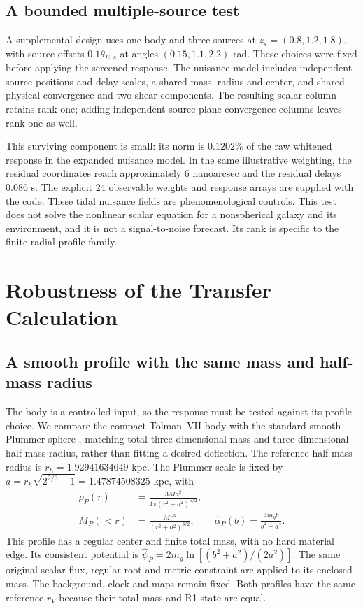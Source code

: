 \subsection{A bounded multiple-source test}
A supplemental design uses one body and three sources at
$z_s=(0.8,1.2,1.8)$, with source offsets $0.1\theta_{E,s}$ at angles
$(0.15,1.1,2.2)$ rad. These choices were fixed before applying the
screened response. The nuisance model includes independent source
positions and delay scales, a shared mass, radius and center, and
shared physical convergence and two shear components.
The resulting scalar column retains rank one; adding independent
source-plane convergence columns leaves rank one as well.

This surviving component is small: its norm is $0.1202\%$ of the raw
whitened response in the expanded nuisance model. In the same illustrative
weighting, the residual coordinates reach approximately $6$ nanoarcsec
and the residual delays $0.086$ s. The explicit 24 observable weights and
response arrays are supplied with the code.
These tidal nuisance fields are phenomenological controls. This test
does not solve the nonlinear scalar equation for a nonspherical galaxy
and its environment, and it is not a signal-to-noise forecast. Its rank
is specific to the finite radial profile family.

\section{Robustness of the Transfer Calculation}
\label{sec:robustness}
\subsection{A smooth profile with the same mass and half-mass radius}
The body is a controlled input, so the response must be tested against
its profile choice. We compare the compact Tolman--VII body with the
standard smooth Plummer sphere \citep{Plummer1911}, matching total
three-dimensional mass and three-dimensional half-mass radius, rather
than fitting a desired deflection. The reference half-mass radius is
$r_h=1.92941634649$ kpc. The Plummer scale is fixed by
$a=r_h\sqrt{2^{2/3}-1}=1.47874508325$ kpc, with
\begin{align}
 \rho_P(r)&=\frac{3Ma^2}{4\pi(r^2+a^2)^{5/2}},\nonumber\\
 M_P(<r)&=\frac{Mr^3}{(r^2+a^2)^{3/2}},\qquad
 \hat\alpha_P(b)=\frac{4m_gb}{b^2+a^2}.
 \label{eq:plummer-control}
\end{align}
This profile has a regular center and finite total mass, with no hard
material edge. Its consistent potential is
$\hat\psi_P=2m_g\ln[(b^2+a^2)/(2a^2)]$.
The same original scalar flux, regular root and metric constraint are
applied to its enclosed mass. The background, clock and maps remain
fixed. Both profiles have the same reference $r_V$ because their total
mass and R1 state are equal.

